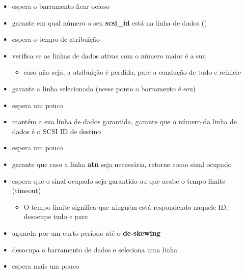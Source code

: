 \documentclass[letterpaper,10pt,brazil]{sphinxmanual}
\begin{document}
\begin{itemize}
\item {} 
espera o barramento ficar ocioso

\item {} 
garante em qual número o seu \textbf{scsi\_id} está na linha de dados
()

\item {} 
espera o tempo de atribuição

\item {} 
verifica se as linhas de dados ativas com o número maior é a sua
\begin{itemize}
\item {} 
caso não seja, a atribuição é perdida, pare a condução de tudo e
reinicie

\end{itemize}

\item {} 
garante a linha selecionada (nesse ponto o barramento é seu)

\item {} 
espera um pouco

\item {} 
mantém a sua linha de dados garantida, garante que o número da linha
de dados é o SCSI ID de destino

\item {} 
espera um pouco

\item {} 
garante que caso a linha \textbf{atn} seja necessária, retorne como sinal
ocupado

\item {} 
espera que o sinal ocupado seja garantido ou que acabe o tempo limite
(timeout)
\begin{itemize}
\item {} 
O tempo limite significa que ninguém está respondendo naquele ID,
desocupe tudo e pare

\end{itemize}

\item {} 
aguarda por um curto período até o \textbf{de-skewing}

\item {} 
desocupa o barramento de dados e seleciona uma linha

\item {} 
espera mais um pouco

\end{itemize}
\end{document}

